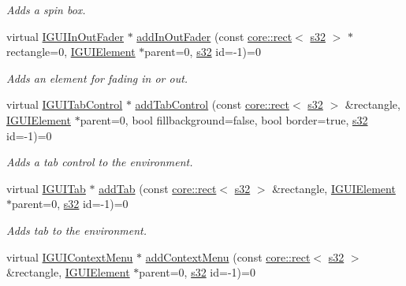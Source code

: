 \begin{DoxyCompactItemize}
\begin{DoxyCompactList}\small\item\em Adds a spin box. \end{DoxyCompactList}\item 
virtual \hyperlink{classirr_1_1gui_1_1IGUIInOutFader}{I\+G\+U\+I\+In\+Out\+Fader} $\ast$ \hyperlink{classirr_1_1gui_1_1IGUIEnvironment_a9ffbddbf3785b54a284d83df4ce3df02}{add\+In\+Out\+Fader} (const \hyperlink{classirr_1_1core_1_1rect}{core\+::rect}$<$ \hyperlink{namespaceirr_ac66849b7a6ed16e30ebede579f9b47c6}{s32} $>$ $\ast$rectangle=0, \hyperlink{classirr_1_1gui_1_1IGUIElement}{I\+G\+U\+I\+Element} $\ast$parent=0, \hyperlink{namespaceirr_ac66849b7a6ed16e30ebede579f9b47c6}{s32} id=-\/1)=0
\begin{DoxyCompactList}\small\item\em Adds an element for fading in or out. \end{DoxyCompactList}\item 
virtual \hyperlink{classirr_1_1gui_1_1IGUITabControl}{I\+G\+U\+I\+Tab\+Control} $\ast$ \hyperlink{classirr_1_1gui_1_1IGUIEnvironment_af076e5646db2e392309aef75edd28238}{add\+Tab\+Control} (const \hyperlink{classirr_1_1core_1_1rect}{core\+::rect}$<$ \hyperlink{namespaceirr_ac66849b7a6ed16e30ebede579f9b47c6}{s32} $>$ \&rectangle, \hyperlink{classirr_1_1gui_1_1IGUIElement}{I\+G\+U\+I\+Element} $\ast$parent=0, bool fillbackground=false, bool border=true, \hyperlink{namespaceirr_ac66849b7a6ed16e30ebede579f9b47c6}{s32} id=-\/1)=0
\begin{DoxyCompactList}\small\item\em Adds a tab control to the environment. \end{DoxyCompactList}\item 
virtual \hyperlink{classirr_1_1gui_1_1IGUITab}{I\+G\+U\+I\+Tab} $\ast$ \hyperlink{classirr_1_1gui_1_1IGUIEnvironment_a67b5c558738d61f4753353de8b96f3c1}{add\+Tab} (const \hyperlink{classirr_1_1core_1_1rect}{core\+::rect}$<$ \hyperlink{namespaceirr_ac66849b7a6ed16e30ebede579f9b47c6}{s32} $>$ \&rectangle, \hyperlink{classirr_1_1gui_1_1IGUIElement}{I\+G\+U\+I\+Element} $\ast$parent=0, \hyperlink{namespaceirr_ac66849b7a6ed16e30ebede579f9b47c6}{s32} id=-\/1)=0
\begin{DoxyCompactList}\small\item\em Adds tab to the environment. \end{DoxyCompactList}\item 
virtual \hyperlink{classirr_1_1gui_1_1IGUIContextMenu}{I\+G\+U\+I\+Context\+Menu} $\ast$ \hyperlink{classirr_1_1gui_1_1IGUIEnvironment_a4f421209425cfe58a29c6fb2e49a2e99}{add\+Context\+Menu} (const \hyperlink{classirr_1_1core_1_1rect}{core\+::rect}$<$ \hyperlink{namespaceirr_ac66849b7a6ed16e30ebede579f9b47c6}{s32} $>$ \&rectangle, \hyperlink{classirr_1_1gui_1_1IGUIElement}{I\+G\+U\+I\+Element} $\ast$parent=0, \hyperlink{namespaceirr_ac66849b7a6ed16e30ebede579f9b47c6}{s32} id=-\/1)=0

\end{DoxyCompactItemize}
